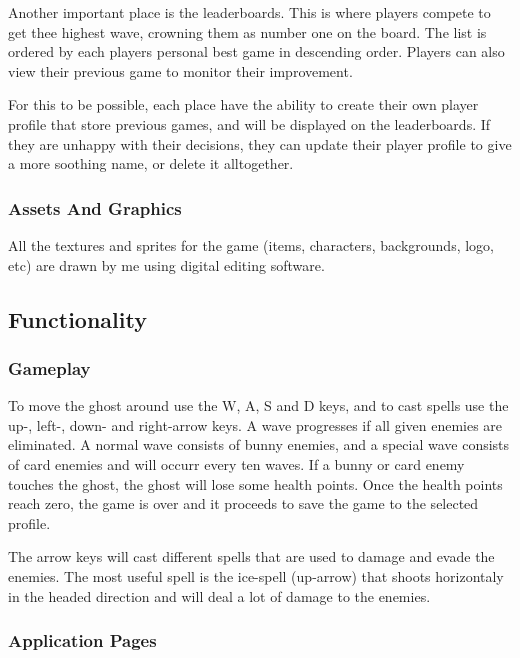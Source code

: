 \documentclass[12pt]{article}
\begin{document}
        Another important place is the leaderboards. This is where players compete to get thee highest wave, crowning them as number one on the board. The list is ordered by each players personal best game in descending order. Players can also view their previous game to monitor their improvement.

        For this to be possible, each place have the ability to create their own player profile that store previous games, and will be displayed on the leaderboards. If they are unhappy with their decisions, they can update their player profile to give a more soothing name, or delete it alltogether.

        \subsubsection{Assets And Graphics}

        All the textures and sprites for the game (items, characters, backgrounds, logo, etc) are drawn by me using digital editing software.

    \subsection{Functionality}

        \subsubsection{Gameplay}

        To move the ghost around use the W, A, S and D keys, and to cast spells use the up-, left-, down- and right-arrow keys. A wave progresses if all given enemies are eliminated. A normal wave consists of bunny enemies, and a special wave consists of card enemies and will occurr every ten waves. If a bunny or card enemy touches the ghost, the ghost will lose some health points. Once the health points reach zero, the game is over and it proceeds to save the game to the selected profile. 

        The arrow keys will cast different spells that are used to damage and evade the enemies. The most useful spell is the ice-spell (up-arrow) that shoots horizontaly in the headed direction and will deal a lot of damage to the enemies.

        \subsubsection{Application Pages}
\end{document}

